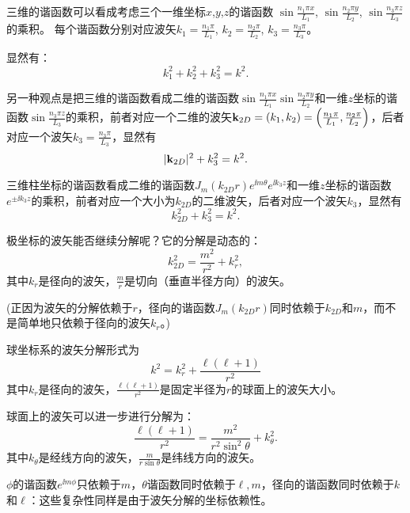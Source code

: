 \documentclass[CJK]{beamer}
\begin{document}
\begin{frame}
\bch
三维的谐函数可以看成考虑三个一维坐标$x$,$y$,$z$的谐函数 $\sin{\frac{n_1\pi x}{L_1}}$, $\sin{\frac{n_2\pi y}{L_2}}$, $\sin{\frac{n_3\pi z}{L_3}}$的乘积。
每个谐函数分别对应波矢$k_1 = \frac{n_1\pi}{L_1}$, $k_2=\frac{n_2\pi}{L_2}$, $k_3=\frac{n_3\pi}{L_3}$。

显然有：
$$k_1^2+k_2^2+k_3^2 = k^2.$$

另一种观点是把三维的谐函数看成二维的谐函数$\sin{\frac{n_1\pi x}{L_1}}\sin{\frac{n_2\pi y}{L_2}}$和一维$z$坐标的谐函数$\sin{\frac{n_3\pi z}{L_3}}$的乘积，前者对应一个二维的波矢${\mathbf{k}}_{2D} = (k_1,k_2) = \left(\frac{n_1\pi }{L_1}, \frac{n_2\pi }{L_2}\right)$，后者对应一个波矢$k_3 = \frac{n_3\pi }{L_3}$，显然有
$$ |{\mathbf{k}}_{2D}|^2 + k_3^2 = k^2 .$$
\ech
\end{frame}




\begin{frame}
\bch
三维柱坐标的谐函数看成二维的谐函数$J_m(k_{2D}r)e^{\ii m\theta}e^{\ii k_3 z}$和一维$z$坐标的谐函数$e^{\pm \ii k_3 z}$的乘积，前者对应一个大小为$k_{2D}$的二维波矢，后者对应一个波矢$k_3$，显然有
$$ k_{2D}^2 + k_3^2 = k^2 .$$

\skiplines

极坐标的波矢能否继续分解呢？它的分解是动态的：
$$k_{2D}^2 = \frac{m^2}{r^2}+k_r^2,$$
其中$k_r$是径向的波矢，$\frac{m}{r}$是切向（垂直半径方向）的波矢。

{\small \darkgreen (正因为波矢的分解依赖于$r$，径向的谐函数$J_m(k_{2D}r)$同时依赖于$k_{2D}$和$m$，而不是简单地只依赖于径向的波矢$k_r$。)}
\ech
\end{frame}




\begin{frame}
\bch
球坐标系的波矢分解形式为
$$ k^2 = k_r^2 + \frac{\ell(\ell+1)}{r^2}$$
其中$k_r$是径向的波矢，$\frac{\ell(\ell+1)}{r^2}$是固定半径为$r$的球面上的波矢大小。

\skiplines

球面上的波矢可以进一步进行分解为：
$$ \frac{\ell(\ell+1)}{r^2} = \frac{m^2}{r^2\sin^2\theta} + k_\theta^2. $$
其中$k_\theta$是经线方向的波矢，$\frac{m}{r\sin\theta}$是纬线方向的波矢。

{\small \darkgreen $\phi$的谐函数$e^{\ii m\phi}$只依赖于$m$，$\theta$谐函数同时依赖于$\ell, m$，径向的谐函数同时依赖于$k$和$\ell$：这些复杂性同样是由于波矢分解的坐标依赖性。}
\ech
\end{frame}
\end{document}
